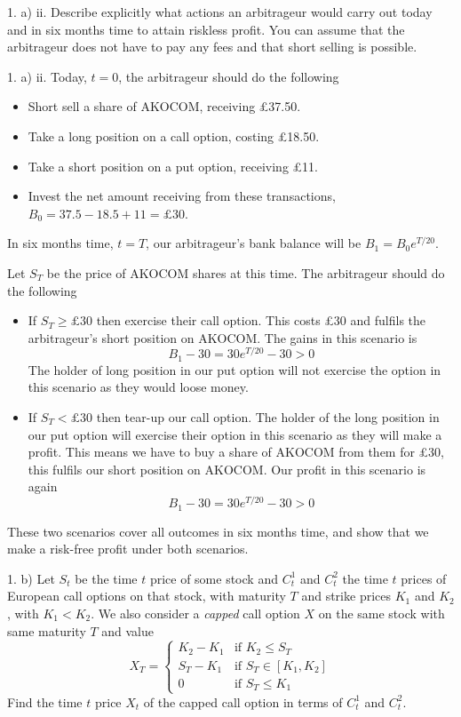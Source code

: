 \documentclass[11pt,a4paper]{article}
\begin{document}
\begin{question}{1. a) ii.}
  Describe explicitly what actions an arbitrageur would carry out today and in six months time to attain riskless profit. You can assume that the arbitrageur does not have to pay any fees and that short selling is possible.
\end{question}

\begin{answer}{1. a) ii.}
  Today, $t=0$, the arbitrageur should do the following
  \begin{itemize}
    \item Short sell a share of AKOCOM, receiving £37.50.
    \item Take a long position on a call option, costing £18.50.
    \item Take a short position on a put option, receiving £11.
    \item Invest the net amount receiving from these transactions, $B_0=37.5-18.5+11=\pounds30$.
  \end{itemize}
  In six months time, $t=T$, our arbitrageur's bank balance will be $B_1=B_0e^{T/20}$.
  \par Let $S_T$ be the price of AKOCOM shares at this time. The arbitrageur should do the following
  \begin{itemize}
    \item If $S_T\geq\pounds30$ then exercise their call option. This costs £30 and fulfils the arbitrageur's short position on AKOCOM. The gains in this scenario is
    \[ B_1-30=30e^{T/20}-30>0 \]
    The holder of long position in our put option will not exercise the option in this scenario as they would loose money.
    \item If $S_T<\pounds30$ then tear-up our call option. The holder of the long position in our put option will exercise their option in this scenario as they will make a profit. This means we have to buy a share of AKOCOM from them for £30, this fulfils our short position on AKOCOM. Our profit in this scenario is again
    \[ B_1-30=30e^{T/20}-30>0 \]
  \end{itemize}
  These two scenarios cover all outcomes in six months time, and show that we make a risk-free profit under both scenarios.
\end{answer}

\begin{question}{1. b)}
  Let $S_t$ be the time $t$ price of some stock and $C_t^1$ and $C_t^2$ the time $t$ prices of European call options on that stock, with maturity $T$ and strike prices $K_1$ and $K_2$, with $K_1<K_2$. We also consider a \textit{capped} call option $X$ on the same stock with same maturity $T$ and value
  \[ X_T=\begin{cases}K_2-K_1&\text{if }K_2\leq S_T\\S_T-K_1&\text{if }S_T\in[K_1,K_2]\\0&\text{if }S_T\leq K_1\end{cases} \]
  Find the time $t$ price $X_t$ of the capped call option in terms of $C_t^1$ and $C_t^2$.
\end{question}
\end{document}
